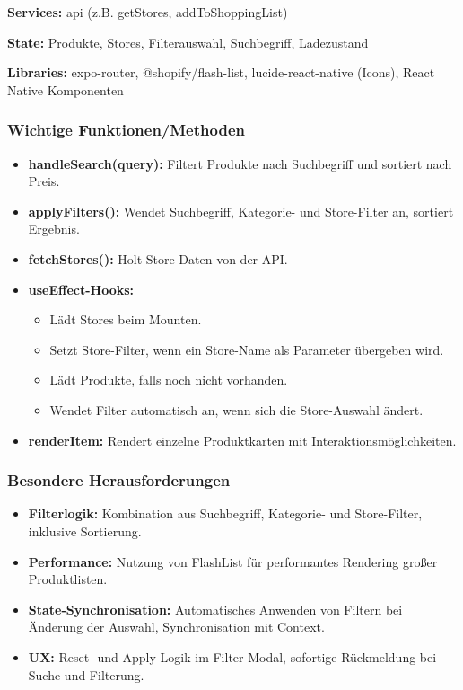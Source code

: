 \documentclass[12pt, a4paper]{report} %
\begin{document}
\textbf{Services:} api (z.B. getStores, addToShoppingList)

\noindent\textbf{State:} Produkte, Stores, Filterauswahl, Suchbegriff, Ladezustand

\noindent\textbf{Libraries:} expo-router, @shopify/flash-list, lucide-react-native (Icons), React Native Komponenten

\subsubsection{Wichtige Funktionen/Methoden}
\begin{itemize}
    \item \textbf{handleSearch(query):} Filtert Produkte nach Suchbegriff und sortiert nach Preis.
    \item \textbf{applyFilters():} Wendet Suchbegriff, Kategorie- und Store-Filter an, sortiert Ergebnis.
    \item \textbf{fetchStores():} Holt Store-Daten von der API.
    \item \textbf{useEffect-Hooks:}
    \begin{itemize}
        \item Lädt Stores beim Mounten.
        \item Setzt Store-Filter, wenn ein Store-Name als Parameter übergeben wird.
        \item Lädt Produkte, falls noch nicht vorhanden.
        \item Wendet Filter automatisch an, wenn sich die Store-Auswahl ändert.
    \end{itemize}
    \item \textbf{renderItem:} Rendert einzelne Produktkarten mit Interaktionsmöglichkeiten.
\end{itemize}

\subsubsection{Besondere Herausforderungen}
\begin{itemize}
    \item \textbf{Filterlogik:} Kombination aus Suchbegriff, Kategorie- und Store-Filter, inklusive Sortierung.
    \item \textbf{Performance:} Nutzung von FlashList für performantes Rendering großer Produktlisten.
    \item \textbf{State-Synchronisation:} Automatisches Anwenden von Filtern bei Änderung der Auswahl, Synchronisation mit Context.
    \item \textbf{UX:} Reset- und Apply-Logik im Filter-Modal, sofortige Rückmeldung bei Suche und Filterung.
\end{itemize}
\end{document}

